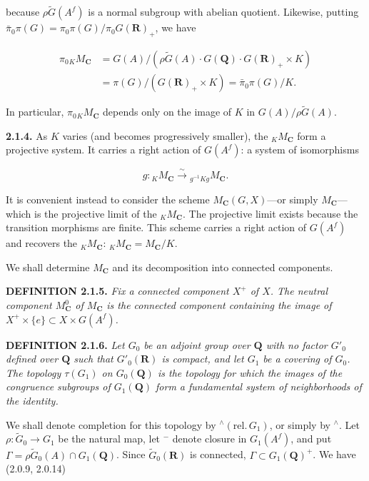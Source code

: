 \documentclass[10pt,a4paper]{article}
\begin{document}
because \(\rho\widetilde G(A^f)\) is a normal subgroup with abelian quotient. Likewise, putting \(\bar\pi_0\pi(G)=\pi_0\pi(G)/\pi_0G(\mathbf R)_+\), we have

\[
\tag{2.1.3.2}
\begin{aligned}
\pi_0{}_K M_{\mathbf C}
&=G(A)/(\rho\widetilde G(A)\cdot G(\mathbf Q)\cdot G(\mathbf R)_+\times K)\\
&=\pi(G)/(G(\mathbf R)_+\times K)
 =\bar\pi_0\pi(G)/K.
\end{aligned}
\]

In particular, \(\pi_0{}_K M_{\mathbf C}\) depends only on the image of \(K\) in \(G(A)/\rho\widetilde G(A)\).

\textbf{2.1.4.} As \(K\) varies (and becomes progressively smaller), the \({}_K M_{\mathbf C}\) form a projective system. It carries a right action of \(G(A^f)\): a system of isomorphisms

\[
g:{}_K M_{\mathbf C}\xrightarrow{\sim}{}_{g^{-1}Kg}M_{\mathbf C}.
\]

It is convenient instead to consider the scheme \(M_{\mathbf C}(G,X)\)---or simply \(M_{\mathbf C}\)---which is the projective limit of the \({}_K M_{\mathbf C}\). The projective limit exists because the transition morphisms are finite. This scheme carries a right action of \(G(A^f)\) and recovers the \({}_K M_{\mathbf C}\): \({}_K M_{\mathbf C}=M_{\mathbf C}/K\).

We shall determine \(M_{\mathbf C}\) and its decomposition into connected components.

\textbf{DEFINITION 2.1.5.} \emph{Fix a connected component \(X^+\) of \(X\). The neutral component \(M_{\mathbf C}^0\) of \(M_{\mathbf C}\) is the connected component containing the image of \(X^+\times\{e\}\subset X\times G(A^f)\).}

\textbf{DEFINITION 2.1.6.} \emph{Let \(G_0\) be an adjoint group over \(\mathbf Q\) with no factor \(G'_0\) defined over \(\mathbf Q\) such that \(G'_0(\mathbf R)\) is compact, and let \(G_1\) be a covering of \(G_0\). The topology \(\tau(G_1)\) on \(G_0(\mathbf Q)\) is the topology for which the images of the congruence subgroups of \(G_1(\mathbf Q)\) form a fundamental system of neighborhoods of the identity.}

We shall denote completion for this topology by \(^{\wedge}(\mathrm{rel.}\,G_1)\), or simply by \(^{\wedge}\). Let \(\rho:\widetilde G_0\to G_1\) be the natural map, let \(^{-}\) denote closure in \(G_1(A^f)\), and put \(\Gamma=\rho\widetilde G_0(A)\cap G_1(\mathbf Q)\). Since \(\widetilde G_0(\mathbf R)\) is connected, \(\Gamma\subset G_1(\mathbf Q)^+\). We have (2.0.9, 2.0.14)
\end{document}
